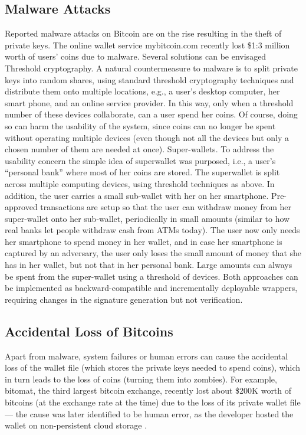 \subsection{Malware Attacks}
Reported malware attacks on Bitcoin are on the rise resulting in the theft of private
keys. The online wallet service mybitcoin.com recently lost \$1:3 million worth
of users’ coins due to malware. Several solutions can be envisaged Threshold cryptography. A natural countermeasure to malware is to split private keys into random shares, using standard threshold cryptography techniques and distribute
them onto multiple locations, e.g., a user’s desktop computer, her smart phone,
and an online service provider. In this way, only when a threshold number of these devices
collaborate, can a user spend her coins. Of course, doing so can harm the usability
of the system, since coins can no longer be spent without operating multiple devices
(even though not all the devices but only a chosen number of them are needed at once).
Super-wallets. To address the usability concern the simple idea of superwallet was purposed,
i.e., a user’s “personal bank” where most of her coins are stored. The superwallet
is split across multiple computing devices, using threshold techniques as above.
In addition, the user carries a small sub-wallet with her on her smartphone. Pre-approved
transactions are setup so that the user can withdraw money from her super-wallet onto
her sub-wallet, periodically in small amounts (similar to how real banks let people withdraw
cash from ATMs today). The user now only needs her smartphone to spend money
in her wallet, and in case her smartphone is captured by an adversary, the user only loses
the small amount of money that she has in her wallet, but not that in her personal bank.
Large amounts can always be spent from the super-wallet using a threshold of devices.
Both approaches can be implemented as backward-compatible and incrementally
deployable wrappers, requiring changes in the signature generation but not verification\cite{elias2011bitcoin}.

\subsection{Accidental Loss of Bitcoins}
Apart from malware, system failures or human errors can cause the accidental loss of the
wallet file (which stores the private keys needed to spend coins), which in turn leads to
the loss of coins (turning them into zombies). For example, bitomat, the third largest
bitcoin exchange, recently lost about \$200K worth of bitcoins (at the exchange rate at
the time) due to the loss of its private wallet file — the cause was later identified to be
human error, as the developer hosted the wallet on non-persistent cloud storage\cite{elias2011bitcoin} \cite{luther2013cryptocurrencies}.

